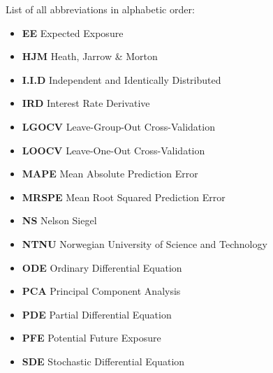 
List of all abbreviations in alphabetic order:

\begin{itemize}
    \item \textbf{EE} Expected Exposure
    \item \textbf{HJM} Heath, Jarrow \& Morton
    \item \textbf{I.I.D} Independent and Identically Distributed
    \item \textbf{IRD} Interest Rate Derivative
    \item \textbf{LGOCV} Leave-Group-Out Cross-Validation
    \item \textbf{LOOCV} Leave-One-Out Cross-Validation
    \item \textbf{MAPE} Mean Absolute Prediction Error
    \item \textbf{MRSPE} Mean Root Squared Prediction Error
    \item \textbf{NS} Nelson Siegel
    \item \textbf{NTNU} Norwegian University of Science and Technology
    \item \textbf{ODE} Ordinary Differential Equation
    \item \textbf{PCA} Principal Component Analysis
    \item \textbf{PDE} Partial Differential Equation
    \item \textbf{PFE} Potential Future Exposure
    \item \textbf{SDE} Stochastic Differential Equation
\end{itemize}